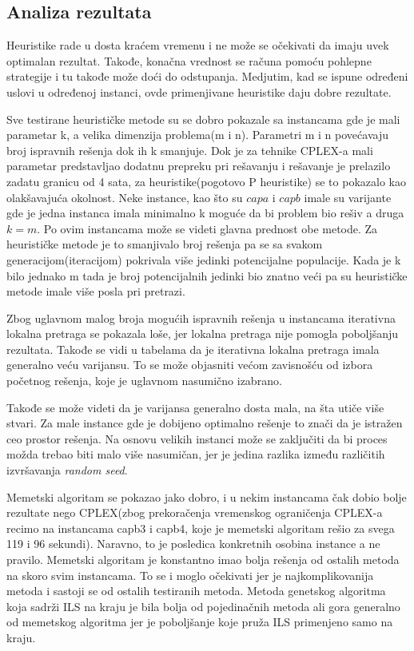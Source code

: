 \documentclass[a4paper]{article}
\begin{document}
\subsection{Analiza rezultata}

Heuristike rade u dosta kraćem vremenu i ne može se očekivati da imaju uvek optimalan rezultat. Takođe, konačna vrednost se računa pomoću pohlepne strategije i tu takođe može doći do odstupanja. Medjutim, kad se ispune određeni uslovi u određenoj instanci, ovde primenjivane heuristike daju dobre rezultate. 

Sve testirane heurističke metode su se dobro pokazale sa instancama gde je mali parametar k, a velika dimenzija problema(m i n). Parametri m i n povećavaju broj ispravnih rešenja dok ih k smanjuje. Dok je za tehnike CPLEX-a mali parametar predstavljao dodatnu prepreku pri rešavanju i rešavanje je prelazilo zadatu granicu od 4 sata, za heuristike(pogotovo P heuristike) se to pokazalo kao olakšavajuća okolnost. Neke instance, kao što su $capa$ i $capb$ imale su varijante gde je jedna instanca imala minimalno k moguće da bi problem bio rešiv a druga $k=m$. Po ovim instancama može se videti glavna prednost obe metode. Za heurističke metode je to smanjivalo broj rešenja pa se sa svakom generacijom(iteracijom) pokrivala više jedinki potencijalne populacije. Kada je k bilo jednako m tada je broj potencijalnih jedinki bio znatno veći pa su heurističke metode imale više posla pri pretrazi. 

Zbog uglavnom malog broja mogućih ispravnih rešenja u instancama iterativna lokalna pretraga se pokazala loše, jer lokalna pretraga nije pomogla poboljšanju rezultata. Takođe se vidi u tabelama da je iterativna lokalna pretraga imala generalno veću varijansu. To se može objasniti većom zavisnošću od izbora početnog rešenja, koje je uglavnom nasumično izabrano.

Takođe se može videti da je varijansa generalno dosta mala, na šta utiče više stvari. Za male instance gde je dobijeno optimalno rešenje to znači da je istražen ceo prostor rešenja. Na osnovu velikih instanci može se zaključiti da bi proces možda trebao biti malo više nasumičan, jer je jedina razlika između različitih izvršavanja \emph{random seed}. 

Memetski algoritam se pokazao jako dobro, i u nekim instancama čak dobio bolje rezultate nego CPLEX(zbog prekoračenja vremenskog ograničenja CPLEX-a recimo na instancama capb3 i capb4, koje je memetski algoritam rešio za svega 119 i 96 sekundi). Naravno, to je posledica konkretnih osobina instance a ne pravilo. Memetski algoritam je konstantno imao bolja rešenja od ostalih metoda na skoro svim instancama. To se i moglo očekivati jer je najkomplikovanija metoda i sastoji se od ostalih testiranih metoda. Metoda genetskog algoritma koja sadrži ILS na kraju je bila bolja od pojedinačnih metoda ali gora generalno od memetskog algoritma jer je poboljšanje koje pruža ILS primenjeno samo na kraju.
\end{document}
